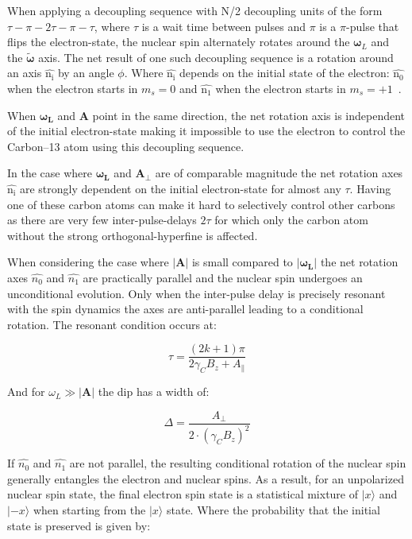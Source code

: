 When applying a decoupling sequence with N\slash 2 decoupling units of the form {$\tau - \pi -2\tau-\pi-\tau$}, where $\tau$ is a wait time between pulses and $\pi$ is a $\pi$-pulse that flips the electron-state, the nuclear spin alternately rotates around the  $\bm\omega_L$ and the $\bm{\tilde{\omega}}$ axis. The net result of one such decoupling sequence is a rotation around an axis $\bm{\hat{\mathrm{n_i}}}$ by an angle $\phi$. Where $\bm{\hat{\mathrm{n_i}}}$ depends on the initial state of the electron: $\bm{\hat{\mathrm{n_0}}}$ when the electron starts in $m_s = 0$ and $\bm{\hat{\mathrm{n_1}}}$ when the electron starts in $m_s = +1$~\citep{Taminiau2012Detection}.

When $\bm{\omega_L}$ and $\bm{A}$ point in the same direction, the net rotation axis is independent of the initial electron-state making it impossible to use the electron to control the Carbon--13 atom using this decoupling sequence.

In the case where $\bm{\omega_L}$ and $\bm{A_\perp}$ are of comparable magnitude the net rotation axes $\bm{\hat{\mathrm{n_i}}}$ are strongly dependent on the initial electron-state for almost any $\tau$. Having one of these carbon atoms can make it hard to selectively control other carbons as there are very few inter-pulse-delays $2\tau$ for which only the carbon atom without the strong orthogonal-hyperfine is affected.

When considering the case where $\bm{|A|}$ is small compared to  $\bm{|\omega_L|}$ the net rotation axes  $\hat{n_0}$ and $\hat{n_1}$ are practically parallel and the nuclear spin undergoes an unconditional evolution. Only when the inter-pulse delay is precisely resonant with the spin dynamics the axes are anti-parallel leading to a conditional rotation\citep{Taminiau2012Detection}. The resonant condition occurs at:

 \begin{equation}
\tau = \frac{(2k+1)\pi}{2 \gamma_C B_z + A_\parallel}
\label{eq:res_dip_loc}
\end{equation}

And for $\omega_L \gg |\bm{A}|$ the dip has a width of:

 \begin{equation}
\Delta = \frac{A_\perp}{2\cdot (\gamma_C B_z)^2}
\label{eq:res_dip_width}
\end{equation}

If  $\hat{n_0}$ and $\hat{n_1}$ are not parallel, the resulting conditional rotation of the nuclear spin generally entangles the electron and nuclear spins. As a result, for an unpolarized nuclear spin state, the final electron spin state is a statistical mixture of $|x\rangle$ and $|-x\rangle$ when starting from the $|x\rangle$  state. Where the probability that the initial state is preserved is given by:

